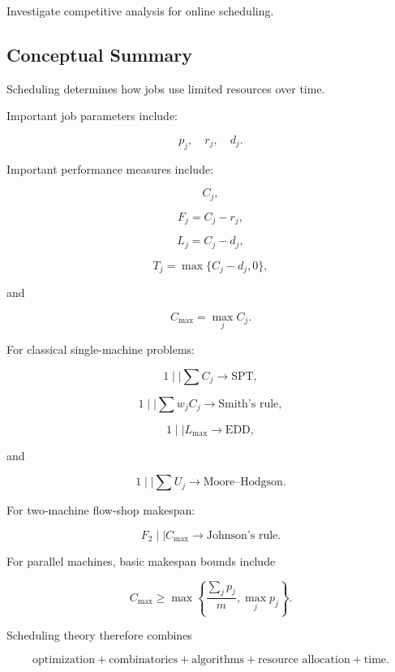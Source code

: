 \begin{exercise}[4]
Investigate competitive analysis for online scheduling.
\end{exercise}

\subsection{Conceptual Summary}
\label{subsec:scheduling-summary}

Scheduling determines how jobs use limited resources over time.

Important job parameters include:

\[
\boxed{
p_j,
\quad
r_j,
\quad
d_j.
}
\]

Important performance measures include:

\[
\boxed{
C_j,
}
\]

\[
\boxed{
F_j=C_j-r_j,
}
\]

\[
\boxed{
L_j=C_j-d_j,
}
\]

\[
\boxed{
T_j=\max\{C_j-d_j,0\},
}
\]

and

\[
\boxed{
C_{\max}=\max_jC_j.
}
\]

For classical single-machine problems:

\[
\boxed{
1\mid\mid\sum C_j
\rightarrow
\text{SPT},
}
\]

\[
\boxed{
1\mid\mid\sum w_jC_j
\rightarrow
\text{Smith's rule},
}
\]

\[
\boxed{
1\mid\mid L_{\max}
\rightarrow
\text{EDD},
}
\]

and

\[
\boxed{
1\mid\mid\sum U_j
\rightarrow
\text{Moore--Hodgson}.
}
\]

For two-machine flow-shop makespan:

\[
\boxed{
F_2\mid\mid C_{\max}
\rightarrow
\text{Johnson's rule}.
}
\]

For parallel machines, basic makespan bounds include

\[
\boxed{
C_{\max}
\geq
\max
\left\{
\frac{\sum_jp_j}{m},
\max_jp_j
\right\}.
}
\]

Scheduling theory therefore combines

\[
\boxed{
\text{optimization}
+
\text{combinatorics}
+
\text{algorithms}
+
\text{resource allocation}
+
\text{time}.
}
\]

